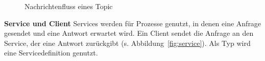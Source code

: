\begin{figure}[ht!]
    \centering
    \caption{Nachrichtenfluss eines Topic}
    \label{fig:topic}
\end{figure}
\textbf{Service und Client} Services werden für Prozesse genutzt, in denen eine Anfrage gesendet und eine Antwort erwartet wird.
Ein Client sendet die Anfrage an den Service, der eine Antwort zurückgibt (s. Abbildung~\ref{fig:service}).
Als Typ wird eine Servicedefinition genutzt.\\

